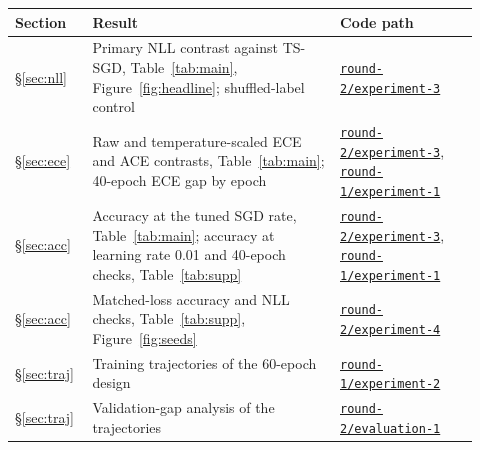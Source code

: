 \documentclass[11pt,letterpaper]{article}
\begin{document}
\begin{longtable}{p{0.14\linewidth}p{0.50\linewidth}p{0.28\linewidth}}
  \toprule
  Section & Result & Code path \\
  \midrule
  \endhead
  \S\ref{sec:nll} & Primary NLL contrast against TS-SGD, Table~\ref{tab:main}, Figure~\ref{fig:headline}; shuffled-label control & \href{https://github.com/ai-inventor-papers/ai-invention-d46016-sharpness-aware-training-makes-small/tree/main/round-2/experiment-3}{\texttt{round-2/experiment-3}} \\
  \S\ref{sec:ece} & Raw and temperature-scaled ECE and ACE contrasts, Table~\ref{tab:main}; 40-epoch ECE gap by epoch & \href{https://github.com/ai-inventor-papers/ai-invention-d46016-sharpness-aware-training-makes-small/tree/main/round-2/experiment-3}{\texttt{round-2/experiment-3}}, \href{https://github.com/ai-inventor-papers/ai-invention-d46016-sharpness-aware-training-makes-small/tree/main/round-1/experiment-1}{\texttt{round-1/experiment-1}} \\
  \S\ref{sec:acc} & Accuracy at the tuned SGD rate, Table~\ref{tab:main}; accuracy at learning rate 0.01 and 40-epoch checks, Table~\ref{tab:supp} & \href{https://github.com/ai-inventor-papers/ai-invention-d46016-sharpness-aware-training-makes-small/tree/main/round-2/experiment-3}{\texttt{round-2/experiment-3}}, \href{https://github.com/ai-inventor-papers/ai-invention-d46016-sharpness-aware-training-makes-small/tree/main/round-1/experiment-1}{\texttt{round-1/experiment-1}} \\
  \S\ref{sec:acc} & Matched-loss accuracy and NLL checks, Table~\ref{tab:supp}, Figure~\ref{fig:seeds} & \href{https://github.com/ai-inventor-papers/ai-invention-d46016-sharpness-aware-training-makes-small/tree/main/round-2/experiment-4}{\texttt{round-2/experiment-4}} \\
  \S\ref{sec:traj} & Training trajectories of the 60-epoch design & \href{https://github.com/ai-inventor-papers/ai-invention-d46016-sharpness-aware-training-makes-small/tree/main/round-1/experiment-2}{\texttt{round-1/experiment-2}} \\
  \S\ref{sec:traj} & Validation-gap analysis of the trajectories & \href{https://github.com/ai-inventor-papers/ai-invention-d46016-sharpness-aware-training-makes-small/tree/main/round-2/evaluation-1}{\texttt{round-2/evaluation-1}} \\
  \bottomrule
\end{longtable}
\end{document}
